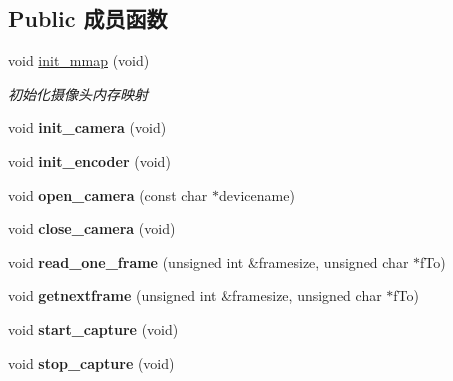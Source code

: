 \subsection*{Public 成员函数}
\begin{DoxyCompactItemize}
\item 
\mbox{\label{class_device_a177a1d7f5a34d87fd34f5dbaff9047cc}} 
void \hyperlink{class_device_a177a1d7f5a34d87fd34f5dbaff9047cc}{init\+\_\+mmap} (void)
\begin{DoxyCompactList}\small\item\em 初始化摄像头内存映射 \end{DoxyCompactList}\item 
\mbox{\label{class_device_a59fed87c831b9ca0087538041e1063fe}} 
void {\bfseries init\+\_\+camera} (void)
\item 
\mbox{\label{class_device_ad733c28e25f18940a4b9c0f8c3bd5bbf}} 
void {\bfseries init\+\_\+encoder} (void)
\item 
\mbox{\label{class_device_a207f256202dc6bcf3d431d7122a92027}} 
void {\bfseries open\+\_\+camera} (const char $\ast$devicename)
\item 
\mbox{\label{class_device_a058dd0e33e2b9c9f7cd13e5e9c4d9e76}} 
void {\bfseries close\+\_\+camera} (void)
\item 
\mbox{\label{class_device_a97b7011e07ec9d92f04aeaedfe6c1ae5}} 
void {\bfseries read\+\_\+one\+\_\+frame} (unsigned int \&framesize, unsigned char $\ast$f\+To)
\item 
\mbox{\label{class_device_a57e890d08316be5b695f332e7ec833e7}} 
void {\bfseries getnextframe} (unsigned int \&framesize, unsigned char $\ast$f\+To)
\item 
\mbox{\label{class_device_a91edaba797d1b176fd3077e6a2c85fe0}} 
void {\bfseries start\+\_\+capture} (void)
\item 
\mbox{\label{class_device_a760f2530ad1a3056ac13d7aaae9448f4}} 
void {\bfseries stop\+\_\+capture} (void)
\item 
\mbox{\label{class_device_a6fc123dd764c6fbda18eb69ea840a4e9}} 

\end{DoxyCompactItemize}
